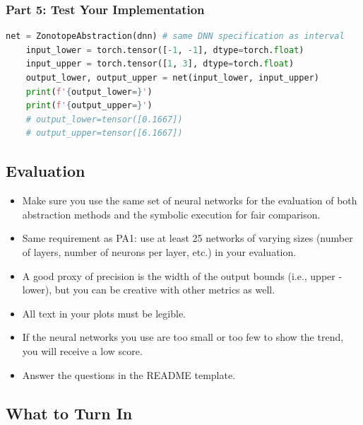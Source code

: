 \subsubsection{Part 5: Test Your Implementation}


\begin{lstlisting}[language=Python]
    net = ZonotopeAbstraction(dnn) # same DNN specification as interval
    input_lower = torch.tensor([-1, -1], dtype=torch.float)
    input_upper = torch.tensor([1, 3], dtype=torch.float)
    output_lower, output_upper = net(input_lower, input_upper)
    print(f'{output_lower=}')
    print(f'{output_upper=}')
    # output_lower=tensor([0.1667])
    # output_upper=tensor([6.1667])
\end{lstlisting}



\subsection{Evaluation}

\begin{itemize}
    \item Make sure you use the same set of neural networks for the evaluation of both abstraction methods and the symbolic execution for fair comparison.
    \item Same requirement as PA1: use at least 25 networks of varying sizes (number of layers, number of neurons per layer, etc.) in your evaluation.
    \item A good proxy of precision is the width of the output bounds (i.e., upper - lower), but you can be creative with other metrics as well. 
    \item All text in your plots must be legible.
    \item If the neural networks you use are too small or too few to show the trend, you will receive a low score.
    \item Answer the questions in the README template.
\end{itemize}


\subsection{What to Turn In}

